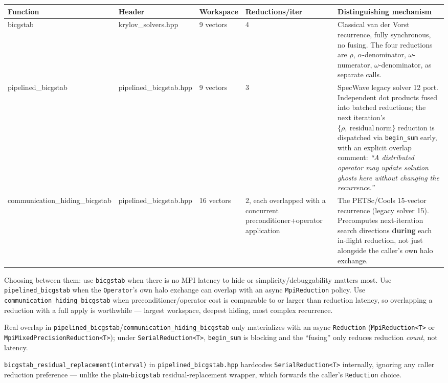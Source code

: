 \documentclass[11pt,a4paper]{report}
\begin{document}
\begin{longtable}{L{0.20\textwidth}L{0.16\textwidth}C{0.10\textwidth}C{0.10\textwidth}P{0.30\textwidth}}
\toprule
Function & Header & Workspace & Reductions/iter & Distinguishing mechanism \\
\midrule
\endhead
bicgstab & krylov\_solvers.hpp & 9 vectors & 4 & Classical van der Vorst recurrence, fully synchronous, no fusing. The four reductions are $\rho$, $\alpha$-denominator, $\omega$-numerator, $\omega$-denominator, as separate calls. \\
pipelined\_bicgstab & pipelined\_bicgstab.hpp & 9 vectors & 3 & SpecWave legacy solver 12 port. Independent dot products fused into batched reductions; the next iteration's $\{\rho,\ \mathrm{residual\ norm}\}$ reduction is dispatched via \lstinline!begin_sum! early, with an explicit overlap comment: \emph{``A distributed operator may update solution ghosts here without changing the recurrence.''} \\
communication\_hiding\_bicgstab & pipelined\_bicgstab.hpp & 16 vectors & 2, each overlapped with a concurrent preconditioner+operator application & The PETSc/Cools 15-vector recurrence (legacy solver 15). Precomputes next-iteration search directions \textbf{during} each in-flight reduction, not just alongside the caller's own halo exchange. \\
\bottomrule
\end{longtable}

Choosing between them: use \lstinline!bicgstab! when there is no MPI latency
to hide or simplicity/debuggability matters most. Use
\lstinline!pipelined_bicgstab! when the \lstinline!Operator!'s own halo exchange can
overlap with an async \lstinline!MpiReduction! policy. Use
\lstinline!communication_hiding_bicgstab! when preconditioner/operator cost is
comparable to or larger than reduction latency, so overlapping a
reduction with a full apply is worthwhile --- largest workspace, deepest
hiding, most complex recurrence.

Real overlap in \lstinline!pipelined_bicgstab!/\lstinline!communication_hiding_bicgstab!
only materializes with an async \lstinline!Reduction! (\lstinline!MpiReduction<T>! or
\lstinline!MpiMixedPrecisionReduction<T>!); under \lstinline!SerialReduction<T>!,
\lstinline!begin_sum! is blocking and the ``fusing'' only reduces reduction
\emph{count}, not latency.

\lstinline!bicgstab_residual_replacement(interval)! in
\texttt{pipelined\_bicgstab.hpp} hardcodes \lstinline!SerialReduction<T>!
internally, ignoring any caller reduction preference --- unlike the
plain-\lstinline!bicgstab! residual-replacement wrapper, which forwards the
caller's \lstinline!Reduction! choice.
\end{document}
